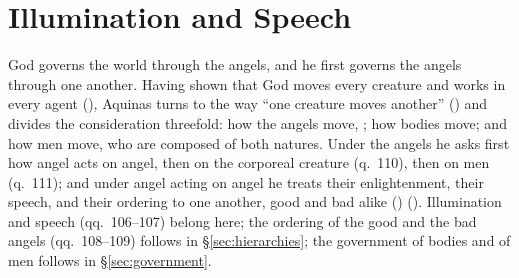 \section{Illumination and Speech}\label{sec:illumination}

God governs the world through the angels, and he first governs the angels
through one another. Having shown that God moves every creature and works
in every agent (), Aquinas turns to the way ``one
creature moves another'' () and
divides the consideration threefold: how the angels move, ; how bodies move; and how men move, who are
composed of both natures. Under the angels he asks first how angel acts on
angel, then on the corporeal creature (q.~110), then on men (q.~111); and
under angel acting on angel he treats their enlightenment, their speech,
and their ordering to one another, good and bad alike () (). Illumination and speech (qq.~106--107) belong here; the ordering
of the good and the bad angels (qq.~108--109) follows in
\S\ref{sec:hierarchies}; the government of bodies and of men follows in
\S\ref{sec:government}.

